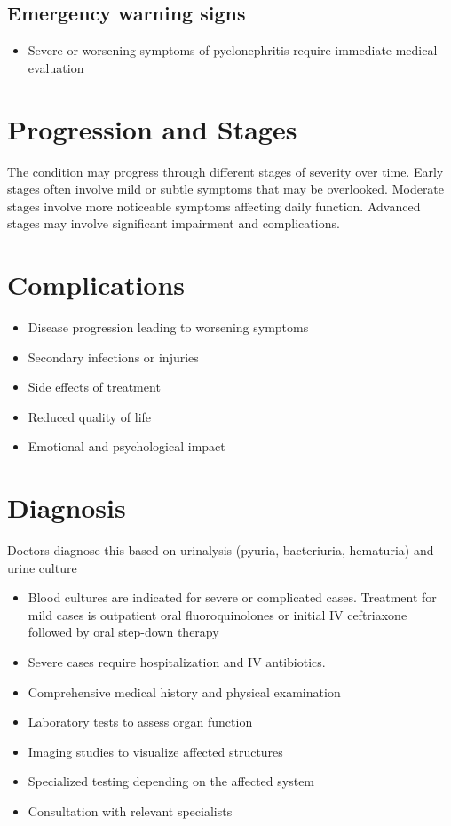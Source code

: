 \subsection{Emergency warning signs}
\begin{itemize}[noitemsep]
  \item Severe or worsening symptoms of pyelonephritis require immediate medical evaluation
\end{itemize}
\section{Progression and Stages}
The condition may progress through different stages of severity over time. Early stages often involve mild or subtle symptoms that may be overlooked. Moderate stages involve more noticeable symptoms affecting daily function. Advanced stages may involve significant impairment and complications.
\section{Complications}
\begin{itemize}[noitemsep]
  \item Disease progression leading to worsening symptoms
  \item Secondary infections or injuries
  \item Side effects of treatment
  \item Reduced quality of life
  \item Emotional and psychological impact
\end{itemize}
\section{Diagnosis}
Doctors diagnose this based on urinalysis (pyuria, bacteriuria, hematuria) and urine culture

\begin{itemize}[noitemsep]
  \item Blood cultures are indicated for severe or complicated cases. Treatment for mild cases is outpatient oral fluoroquinolones or initial IV ceftriaxone followed by oral step-down therapy
  \item Severe cases require hospitalization and IV antibiotics.
  \item Comprehensive medical history and physical examination
  \item Laboratory tests to assess organ function
  \item Imaging studies to visualize affected structures
  \item Specialized testing depending on the affected system
  \item Consultation with relevant specialists
\end{itemize}
